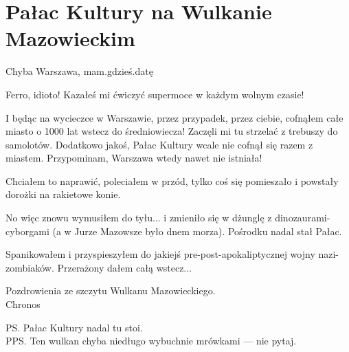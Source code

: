 \chapter{Pałac Kultury na Wulkanie Mazowieckim}



\begin{flushright}
Chyba Warszawa, mam.gdzieś.datę
\end{flushright} 

Ferro, idioto! Kazałeś mi ćwiczyć supermoce w każdym wolnym czasie!

I będąc na wycieczce w Warszawie, przez przypadek, przez ciebie, cofnąłem całe miasto o 1000 lat wstecz do średniowiecza!
Zaczęli mi tu strzelać z trebuszy do samolotów.
Dodatkowo jakoś, Pałac Kultury wcale nie cofnął się razem z miastem. 
Przypominam, Warszawa wtedy nawet nie istniała!

Chciałem to naprawić, poleciałem w przód, tylko coś się pomieszało i powstały dorożki na rakietowe konie.

No więc znowu wymusiłem do tyłu... i zmieniło się w dżunglę z dinozaurami-cyborgami (a w Jurze Mazowsze było dnem morza).
Pośrodku nadal stał Pałac.

Spanikowałem i przyspieszyłem do jakiejś pre-post-apokaliptycznej wojny nazi-zombiaków. Przerażony dałem całą wstecz...

Pozdrowienia ze szczytu Wulkanu Mazowieckiego. \\
Chronos
\bigskip

PS. Pałac Kultury nadal tu stoi. \\
PPS. Ten wulkan chyba niedługo wybuchnie mrówkami --- nie pytaj.
